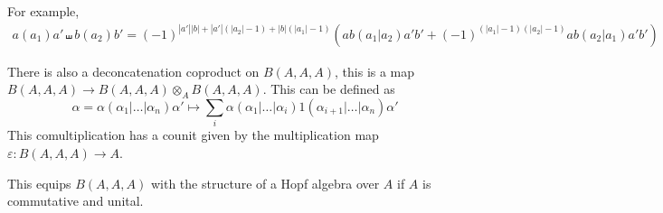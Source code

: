 \documentclass{scrartcl}
\theoremstyle{plain}
\newtheorem{theorem}{Theorem}[section]
\newtheorem{lemma}[theorem]{Lemma}
\theoremstyle{definition}
\newcommand{\N}{\mathbb N}
\newcommand{\abs}[1]{\left\lvert#1\right\rvert}
\let\xto\xrightarrow
\DeclareMathOperator{\id}{id}
\DeclareMathOperator{\colim}{colim}
\begin{document}
For example,
\begin{align*}
    a(a_1)a' \shuffle b(a_2)b' = (-1)^{\abs{a'}\abs{b}+\abs{a'}(\abs{a_2}-1) + \abs{b}(\abs{a_1}-1)}\left(ab(a_1|a_2)a'b' + (-1)^{(\abs{a_1}-1)(\abs{a_2}-1)}ab(a_2|a_1)a'b'\right)
\end{align*}

There is also a deconcatenation coproduct on $B(A, A, A)$, this is a map $B(A, A, A)\to B(A, A, A)\otimes_A B(A, A, A)$. This can be defined as 
$$\alpha = \alpha(\alpha_1|\dots|\alpha_n)\alpha' \mapsto \sum_i\alpha(\alpha_1|\dots|\alpha_i) 1 (\alpha_{i+1}|\dots|\alpha_n)\alpha'$$
This comultiplication has a counit given by the multiplication map $\varepsilon \colon B(A, A, A)\to A$. 

This equips $B(A, A, A)$ with the structure of a Hopf algebra over $A$ if $A$ is commutative and unital.

    
\end{document}
